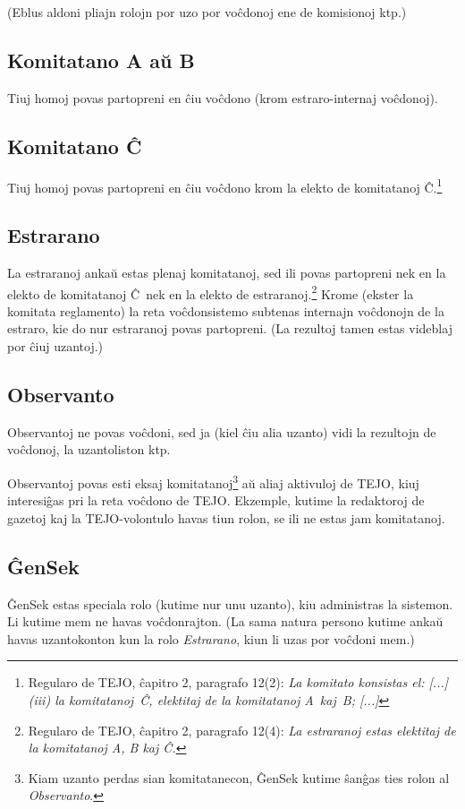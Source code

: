 \documentclass[draft]{scrartcl}
\begin{document}
(Eblus aldoni pliajn rolojn por uzo por voĉdonoj ene de komisionoj ktp.)

\subsection{Komitatano A aŭ B}
Tiuj homoj povas partopreni en ĉiu voĉdono (krom estraro-internaj voĉdonoj).

\subsection{Komitatano Ĉ}
Tiuj homoj povas partopreni en ĉiu voĉdono krom la elekto
de komitatanoj Ĉ.\footnote{Regularo de TEJO, ĉapitro 2, paragrafo 12(2):
\emph{La komitato konsistas el: [...] (iii) la komitatanoj~Ĉ, elektitaj de la komitatanoj A~kaj~B; [...]}}

\subsection{Estrarano}
La estraranoj ankaŭ estas plenaj komitatanoj, sed ili povas partopreni
nek en la elekto de komitatanoj Ĉ\footnotemark[\thefootnote]\ nek en la elekto de estraranoj.\footnote{%
  Regularo de TEJO, ĉapitro 2, paragrafo 12(4):
  \emph{La estraranoj estas elektitaj de la komitatanoj A, B kaj Ĉ.}%
}
Krome (ekster la komitata reglamento) la reta voĉdonsistemo subtenas
internajn voĉdonojn de la estraro, kie do nur estraranoj povas partopreni.
(La rezultoj tamen estas videblaj por ĉiuj uzantoj.)

\subsection{Observanto}
Observantoj ne povas voĉdoni, sed ja (kiel ĉiu alia uzanto) vidi
la rezultojn de voĉdonoj, la uzantoliston ktp.

Observantoj povas esti eksaj komitatanoj\footnote{Kiam uzanto perdas sian
  komitatanecon, ĜenSek kutime ŝanĝas ties rolon al \emph{Observanto}.}
 aŭ aliaj aktivuloj de TEJO, kiuj interesiĝas pri la reta voĉdono de TEJO.
Ekzemple, kutime la redaktoroj de gazetoj kaj la TEJO-volontulo havas tiun
rolon, se ili ne estas jam komitatanoj.

\subsection{ĜenSek}
ĜenSek estas speciala rolo (kutime nur unu uzanto), kiu administras la
sistemon. Li kutime mem ne havas voĉdonrajton. (La sama natura persono
kutime ankaŭ havas uzantokonton kun la rolo \emph{Estrarano}, kiun li uzas
por voĉdoni mem.)
\end{document}
